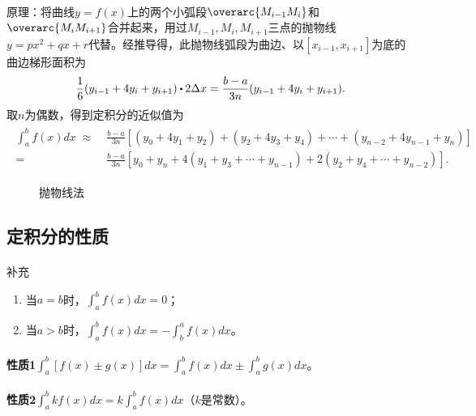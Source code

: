 \paragraph{}
原理：将曲线$y=f(x)$上的两个小弧段$\overarc{M_{i-1}M_i}$和$\overarc{M_iM_{i+1}}$合并起来，用过$M_{i-1}, M_i, M_{i+1}$三点的抛物线$y = px^2+qx+r$代替。经推导得，此抛物线弧段为曲边、以$[x_{i-1},x_{i+1}]$为底的曲边梯形面积为
\begin{equation}
  \frac{1}{6}(y_{i-1}+4y_i+y_{i+1}) \bigcdot 2\Delta x = \frac{b-a}{3n}(y_{i-1} + 4y_i + y_{i+1}).
\end{equation}
取$n$为偶数，得到定积分的近似值为
\begin{align}
\begin{split}
  \int_a^bf(x)dx \;\approx&\; \frac{b-a}{3n}[(y_0+4y_1+y_2) + (y_2+4y_3+y_4) + \cdots + (y_{n-2}+4y_{n-1}+y_n)] \\
  =&\; \frac{b-a}{3n}[y_0+y_n+4(y_1+y_3+\cdots+y_{n-1}) + 2(y_2+y_4+\cdots+y_{n-2})].
\end{split}
\end{align}

\begin{figure}[H]
\centering
  
  \caption{抛物线法}
  \label{抛物线法}
\end{figure}

\subsection{定积分的性质}
\paragraph{}
补充
\begin{enumerate}
  \item 当$a=b$时，$\displaystyle\int_a^bf(x)dx=0$；
  \item 当$a>b$时，$\displaystyle\int_a^bf(x)dx = -\int_b^af(x)dx$。
\end{enumerate}

\paragraph{}
\textbf{性质1\;}$\displaystyle\int_a^b[f(x)\pm g(x)]dx = \int_a^bf(x)dx \pm \int_a^bg(x)dx$。

\paragraph{}
\textbf{性质2\;}$\displaystyle\int_a^bkf(x)dx = k\int_a^bf(x)dx$（$k$是常数）。

